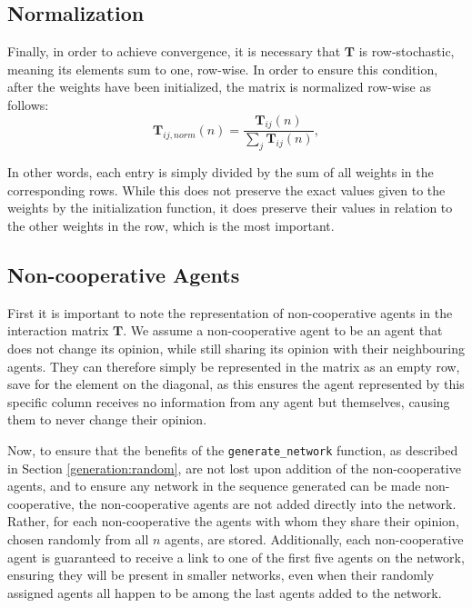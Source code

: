 \documentclass[a4paper, 12pt]{report}
\newcommand{\T}{\bm{T}}
\begin{document}
\subsection{Normalization}
\label{weights:normalization}
Finally, in order to achieve convergence, it is necessary that $\T$ is row-stochastic, meaning its elements sum to one, row-wise. In order to ensure this condition, after the weights have been initialized, the matrix is normalized row-wise as follows:
\begin{equation*}
    \T_{ij, norm}(n) = \frac{\T_{ij}(n)}{\sum_{j}\T_{ij}(n)},
\end{equation*}

\noindent In other words, each entry is simply divided by the sum of all weights in the corresponding rows. While this does not preserve the exact values given to the weights by the initialization function, it does preserve their values in relation to the other weights in the row, which is the most important.

\newpage

\subsection{Non-cooperative Agents}

\noindent First it is important to note the representation of non-cooperative agents in the interaction matrix $\T$. We assume a non-cooperative agent to be an agent that does not change its opinion, while still sharing its opinion with their neighbouring agents. They can therefore simply be represented in the matrix as an empty row, save for the element on the diagonal, as this ensures the agent represented by this specific column receives no information from any agent but themselves, causing them to never change their opinion.

\noindent Now, to ensure that the benefits of the \texttt{generate\_network} function, as described in Section \ref{generation:random}, are not lost upon addition of the non-cooperative agents, and to ensure any network in the sequence generated can be made non-cooperative, the non-cooperative agents are not added directly into the network. Rather, for each non-cooperative the agents with whom they share their opinion, chosen randomly from all $n$ agents, are stored. Additionally, each non-cooperative agent is guaranteed to receive a link to one of the first five agents on the network, ensuring they will be present in smaller networks, even when their randomly assigned agents all happen to be among the last agents added to the network.
\end{document}
